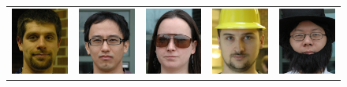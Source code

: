 \begin{figure}
\begin{tabular}{ccccc}
\includegraphics[width=\imagewidth]{figures_iccv/real_data_examples/normal_5.jpg} & \includegraphics[width=\imagewidth]{figures_iccv/real_data_examples/glasses_5.jpg} & \includegraphics[width=\imagewidth]{figures_iccv/real_data_examples/sunglasses_5.jpg} & \includegraphics[width=\imagewidth]{figures_iccv/real_data_examples/hats_5.jpg} & \includegraphics[width=\imagewidth]{figures_iccv/real_data_examples/disguise_5.jpg}
\e
\end{tabular}
\end{figure}
